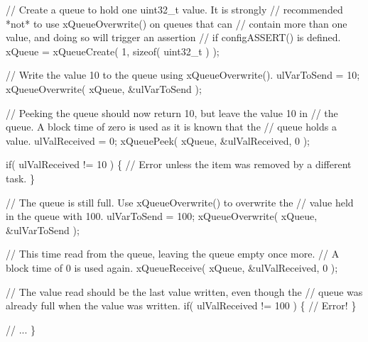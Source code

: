 \begin{DoxyPre}    // Create a queue to hold one uint32\_t value.  It is strongly
    // recommended *not* to use xQueueOverwrite() on queues that can
    // contain more than one value, and doing so will trigger an assertion
    // if configASSERT() is defined.
    xQueue = xQueueCreate( 1, sizeof( uint32\_t ) );\end{DoxyPre}



\begin{DoxyPre}    // Write the value 10 to the queue using xQueueOverwrite().
    ulVarToSend = 10;
    xQueueOverwrite( xQueue, \&ulVarToSend );\end{DoxyPre}



\begin{DoxyPre}    // Peeking the queue should now return 10, but leave the value 10 in
    // the queue.  A block time of zero is used as it is known that the
    // queue holds a value.
    ulValReceived = 0;
    xQueuePeek( xQueue, \&ulValReceived, 0 );\end{DoxyPre}



\begin{DoxyPre}    if( ulValReceived != 10 )
    \{
        // Error unless the item was removed by a different task.
    \}\end{DoxyPre}



\begin{DoxyPre}    // The queue is still full.  Use xQueueOverwrite() to overwrite the
    // value held in the queue with 100.
    ulVarToSend = 100;
    xQueueOverwrite( xQueue, \&ulVarToSend );\end{DoxyPre}



\begin{DoxyPre}    // This time read from the queue, leaving the queue empty once more.
    // A block time of 0 is used again.
    xQueueReceive( xQueue, \&ulValReceived, 0 );\end{DoxyPre}



\begin{DoxyPre}    // The value read should be the last value written, even though the
    // queue was already full when the value was written.
    if( ulValReceived != 100 )
    \{
        // Error!
    \}\end{DoxyPre}



\begin{DoxyPre}    // ...
\}
 \end{DoxyPre}
 